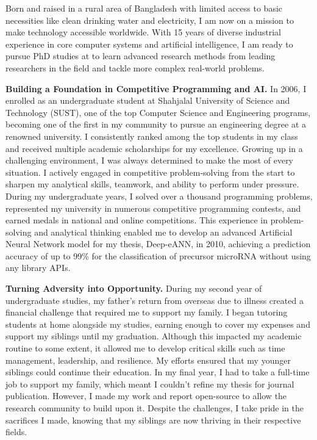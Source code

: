 
Born and raised in a rural area of Bangladesh with limited access to basic necessities like clean drinking water and electricity,
I am now on a mission to make technology accessible worldwide.
With 15 years of diverse industrial experience in core computer systems and artificial intelligence,
I am ready to pursue PhD studies at \GetUniversityName  to learn advanced research methods from leading researchers in the field
and tackle more complex real-world problems.

\textbf{Building a Foundation in Competitive Programming and AI.}
In 2006, I enrolled as an undergraduate student at Shahjalal University of Science and Technology (SUST),
one of the top Computer Science and Engineering programs, becoming one of the first in my community
to pursue an engineering degree at a renowned university.
I consistently ranked among the top students in my class and received multiple academic scholarships for my excellence.
Growing up in a challenging environment, I was always determined to make the most of every situation.
I actively engaged in competitive problem-solving from the start to sharpen my analytical skills, teamwork,
and ability to perform under pressure.
During my undergraduate years, I solved over a thousand programming problems, represented my university
in numerous competitive programming contests, and earned medals in national and online competitions.
This experience in problem-solving and analytical thinking enabled me to develop an advanced Artificial Neural Network
model for my thesis, Deep-eANN, in 2010, achieving a prediction accuracy of up to 99\% for the classification
of precursor microRNA without using any library APIs.

\textbf{Turning Adversity into Opportunity.}
During my second year of undergraduate studies, my father’s return from overseas due to illness
created a financial challenge that required me to support my family.
I began tutoring students at home alongside my studies, earning enough to cover my expenses
and support my siblings until my graduation.
Although this impacted my academic routine to some extent, it allowed me to develop critical skills
such as time management, leadership, and resilience.
My efforts ensured that my younger siblings could continue their education.
In my final year, I had to take a full-time job to support my family, which meant I couldn't refine my thesis
for journal publication.
However, I made my work and report open-source to allow the research community to build upon it.
Despite the challenges, I take pride in the sacrifices I made, knowing that my siblings are now thriving
in their respective fields.

